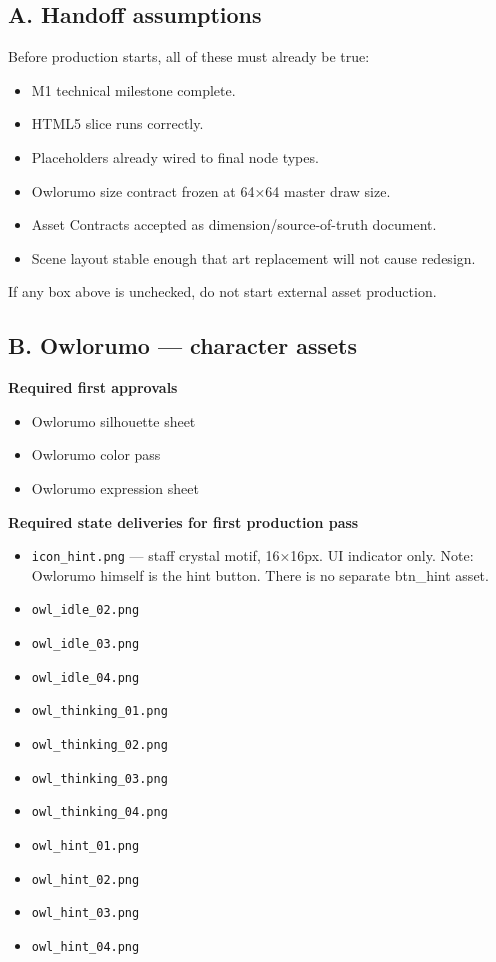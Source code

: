 \documentclass[11pt,a4paper]{article}
\newcommand{\checkbox}{\ensuremath{\square}}
\begin{document}
\subsection*{A. Handoff assumptions}
Before production starts, all of these must already be true:
\begin{itemize}
  \item[\checkbox] M1 technical milestone complete.
  \item[\checkbox] HTML5 slice runs correctly.
  \item[\checkbox] Placeholders already wired to final node types.
  \item[\checkbox] Owlorumo size contract frozen at 64×64 master draw size.
  \item[\checkbox] Asset Contracts accepted as dimension/source-of-truth document.
  \item[\checkbox] Scene layout stable enough that art replacement will not cause redesign.
\end{itemize}

If any box above is unchecked, do not start external asset production.

\subsection*{B. Owlorumo — character assets}
\textbf{Required first approvals}
\begin{itemize}
  \item[\checkbox] Owlorumo silhouette sheet
  \item[\checkbox] Owlorumo color pass
  \item[\checkbox] Owlorumo expression sheet
\end{itemize}

\textbf{Required state deliveries for first production pass}
\begin{itemize}
  \item[\checkbox] \texttt{icon\_hint.png} — staff crystal motif, 16×16px. UI indicator only.
  Note: Owlorumo himself is the hint button. There is no separate btn\_hint asset.
  \item[\checkbox] \texttt{owl\_idle\_02.png}
  \item[\checkbox] \texttt{owl\_idle\_03.png}
  \item[\checkbox] \texttt{owl\_idle\_04.png}
  \item[\checkbox] \texttt{owl\_thinking\_01.png}
  \item[\checkbox] \texttt{owl\_thinking\_02.png}
  \item[\checkbox] \texttt{owl\_thinking\_03.png}
  \item[\checkbox] \texttt{owl\_thinking\_04.png}
  \item[\checkbox] \texttt{owl\_hint\_01.png}
  \item[\checkbox] \texttt{owl\_hint\_02.png}
  \item[\checkbox] \texttt{owl\_hint\_03.png}
  \item[\checkbox] \texttt{owl\_hint\_04.png}
\end{itemize}
\end{document}

